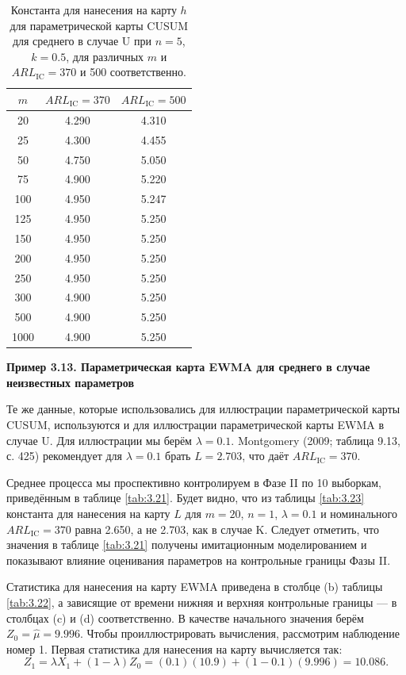 \begin{table}[htbp]
	\centering
	\caption{Константа для нанесения на карту \(h\) для параметрической карты CUSUM для среднего в случае U при \(n = 5\), \(k = 0.5\), для различных \(m\) и \(ARL_{\text{IC}} = 370\) и 500 соответственно.}
	\label{tab:3.20}
	\begin{tabular}{ccc}
		\toprule
		\(m\) & \(ARL_{\text{IC}} = 370\) & \(ARL_{\text{IC}} = 500\) \\
		\midrule
		20   & 4.290 & 4.310 \\
		25   & 4.300 & 4.455 \\
		50   & 4.750 & 5.050 \\
		75   & 4.900 & 5.220 \\
		100  & 4.950 & 5.247 \\
		125  & 4.950 & 5.250 \\
		150  & 4.950 & 5.250 \\
		200  & 4.950 & 5.250 \\
		250  & 4.950 & 5.250 \\
		300  & 4.900 & 5.250 \\
		500  & 4.900 & 5.250 \\
		1000 & 4.900 & 5.250 \\
		\bottomrule
	\end{tabular}
\end{table}

\noindent\textbf{Пример 3.13. Параметрическая карта EWMA для среднего в случае неизвестных параметров}

Те же данные, которые использовались для иллюстрации параметрической карты CUSUM, используются и для иллюстрации параметрической карты EWMA в случае U. Для иллюстрации мы берём \(\lambda = 0.1\). Montgomery (2009; таблица 9.13, с. 425) рекомендует для \(\lambda = 0.1\) брать \(L = 2.703\), что даёт \(ARL_{\text{IC}} = 370\).

Среднее процесса мы проспективно контролируем в Фазе II по 10 выборкам, приведённым в таблице \ref{tab:3.21}. Будет видно, что из таблицы \ref{tab:3.23} константа для нанесения на карту \(L\) для \(m = 20\), \(n = 1\), \(\lambda = 0.1\) и номинального \(ARL_{\text{IC}} = 370\) равна 2.650, а не 2.703, как в случае K. Следует отметить, что значения в таблице \ref{tab:3.21} получены имитационным моделированием и показывают влияние оценивания параметров на контрольные границы Фазы II.

Статистика для нанесения на карту EWMA приведена в столбце (b) таблицы \ref{tab:3.22}, а зависящие от времени нижняя и верхняя контрольные границы — в столбцах (c) и (d) соответственно. В качестве начального значения берём \(Z_0 = \hat{\mu} = 9.996\). Чтобы проиллюстрировать вычисления, рассмотрим наблюдение номер 1. Первая статистика для нанесения на карту вычисляется так:
\[
	Z_1 = \lambda X_1 + (1 - \lambda)Z_0 = (0.1)(10.9) + (1 - 0.1)(9.996) = 10.086.
\]

